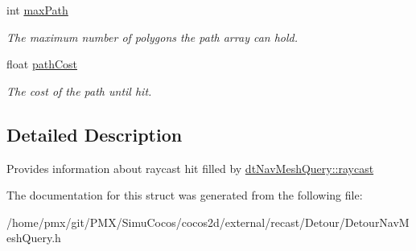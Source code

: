 \begin{DoxyCompactItemize}
\mbox{\label{structdtRaycastHit_a62b75cb350d9ace5e47887c7c1add9b3}} 
int \hyperlink{structdtRaycastHit_a62b75cb350d9ace5e47887c7c1add9b3}{max\+Path}
\begin{DoxyCompactList}\small\item\em The maximum number of polygons the {\ttfamily path} array can hold. \end{DoxyCompactList}\item 
\mbox{\label{structdtRaycastHit_aa545333016e4844923a022263ab6a5fa}} 
float \hyperlink{structdtRaycastHit_aa545333016e4844923a022263ab6a5fa}{path\+Cost}
\begin{DoxyCompactList}\small\item\em The cost of the path until hit. \end{DoxyCompactList}\end{DoxyCompactItemize}


\subsection{Detailed Description}
Provides information about raycast hit filled by \hyperlink{classdtNavMeshQuery_a7509a4bf31a215f20478c5050ef25913}{dt\+Nav\+Mesh\+Query\+::raycast} 

The documentation for this struct was generated from the following file\+:\begin{DoxyCompactItemize}
\item 
/home/pmx/git/\+P\+M\+X/\+Simu\+Cocos/cocos2d/external/recast/\+Detour/Detour\+Nav\+Mesh\+Query.\+h\end{DoxyCompactItemize}
